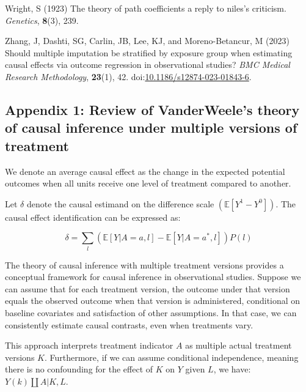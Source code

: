 \documentclass[
  singlecolumn]{article}
\newlength{\cslhangindent}
\newlength{\cslentryspacingunit} %
\newenvironment{CSLReferences}[2] %
 {%
  \setlength{\parindent}{0pt}
  \ifodd #1
  \let\oldpar\par
  \def\par{\hangindent=\cslhangindent\oldpar}
  \fi
  \setlength{\parskip}{#2\cslentryspacingunit}
 }%
 {}
\begin{document}
\begin{CSLReferences}{1}{0}
\leavevmode{}%
Wright, S (1923) The theory of path coefficients a reply to niles's
criticism. \emph{Genetics}, \textbf{8}(3), 239.

\leavevmode{}%
Zhang, J, Dashti, SG, Carlin, JB, Lee, KJ, and Moreno-Betancur, M (2023)
Should multiple imputation be stratified by exposure group when
estimating causal effects via outcome regression in observational
studies? \emph{BMC Medical Research Methodology}, \textbf{23}(1), 42.
doi:\href{https://doi.org/10.1186/s12874-023-01843-6}{10.1186/s12874-023-01843-6}.

\end{CSLReferences}

\newpage{}

\hypertarget{appendix-1-review-of-vanderweeles-theory-of-causal-inference-under-multiple-versions-of-treatment}{%
\subsection{Appendix 1: Review of VanderWeele's theory of causal
inference under multiple versions of
treatment}\label{appendix-1-review-of-vanderweeles-theory-of-causal-inference-under-multiple-versions-of-treatment}}

We denote an average causal effect as the change in the expected
potential outcomes when all units receive one level of treatment
compared to another.

Let \(\delta\) denote the causal estimand on the difference scale
\((\mathbb{E}[Y^1 - Y^0])\). The causal effect identification can be
expressed as:

\[ \delta = \sum_l \left( \mathbb{E}[Y|A=a,l] - \mathbb{E}[Y|A=a^*,l] \right) P(l)\]

The theory of causal inference with multiple treatment versions provides
a conceptual framework for causal inference in observational studies.
Suppose we can assume that for each treatment version, the outcome under
that version equals the observed outcome when that version is
administered, conditional on baseline covariates and satisfaction of
other assumptions. In that case, we can consistently estimate causal
contrasts, even when treatments vary.

This approach interprets treatment indicator \(A\) as multiple actual
treatment versions \(K\). Furthermore, if we can assume conditional
independence, meaning there is no confounding for the effect of \(K\) on
\(Y\) given \(L\), we have: \(Y(k)\coprod A|K,L\).
\end{document}
